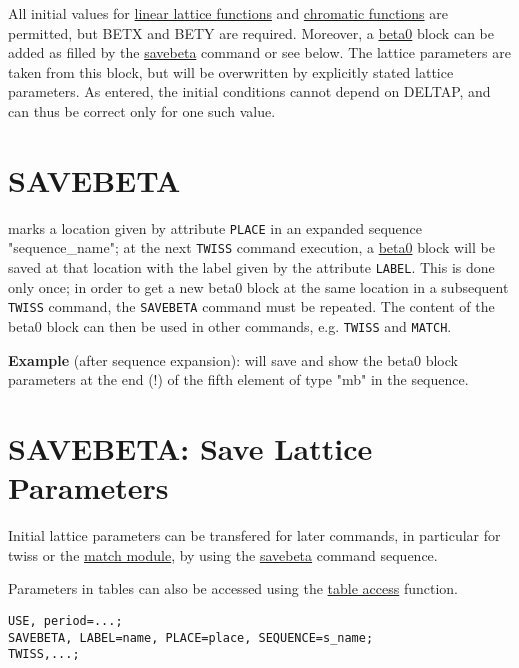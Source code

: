 All initial values for \href{../Introduction/tables.html#linear}{linear
  lattice functions} and
\href{../Introduction/tables.html#chrom}{chromatic functions} are
permitted, but BETX and BETY are required. Moreover, a
\href{beta0}{beta0} block can be added as filled by the
\href{../control/general.html#savebeta}{savebeta} command or see
below. The lattice parameters are taken from this block, but will be
overwritten by explicitly stated lattice parameters. As entered, the
initial conditions cannot depend on DELTAP, and can thus be correct only
for one such value.  

\section{SAVEBETA}
\label{sec:savebeta}
marks a location given by attribute \texttt{PLACE} in an expanded sequence "sequence\_name"; 
at the next \texttt{TWISS} command execution, a
\href{../twiss/twiss.html#beta0}{beta0} 
block will be saved at that location with the label given by the
attribute \texttt{LABEL}. 
This is done only once; in order to get a new beta0 block at the same
location in a subsequent \texttt{TWISS} command, the \texttt{SAVEBETA}
command  must be repeated.
The content of the beta0 block can then be used in other
commands, e.g. \texttt{TWISS} and \texttt{MATCH}.  

{\bf Example} (after sequence expansion): 
will save and show the beta0 block parameters at the end (!) of the
fifth element of type "mb" in the sequence.  


\section{SAVEBETA: Save Lattice Parameters}

Initial lattice parameters can be transfered for later commands, in
particular for twiss or the \href{../match/match.html}{match module}, by
using the \href{../control/general.html#savebeta}{savebeta} command
sequence.  

Parameters in tables can also be accessed 
using the \href{../Introduction/expression.html#table}{table access}
function. 
\begin{verbatim}
USE, period=...;
SAVEBETA, LABEL=name, PLACE=place, SEQUENCE=s_name;
TWISS,...;
\end{verbatim}

